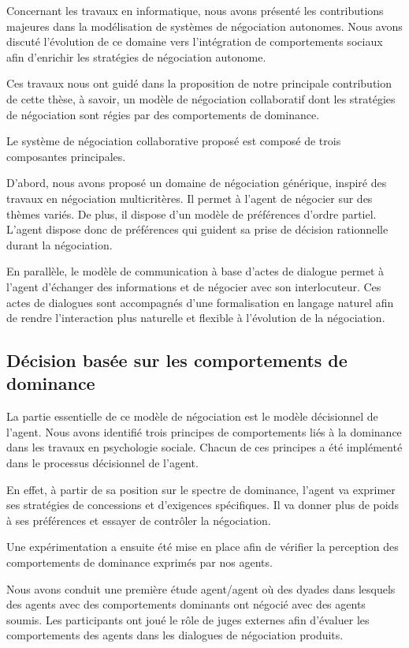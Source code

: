 Concernant les travaux en informatique, nous avons présenté les contributions majeures dans la modélisation de systèmes de négociation autonomes. Nous avons discuté l'évolution de ce domaine vers l'intégration de comportements sociaux afin d'enrichir les stratégies de négociation autonome. 

Ces travaux nous ont guidé dans la proposition de notre principale contribution de cette thèse, à savoir, un modèle de négociation collaboratif dont les stratégies de négociation sont régies par des comportements de dominance.

Le système de négociation collaborative proposé est composé de trois composantes principales.

D'abord, nous avons proposé un domaine de négociation générique, inspiré des travaux en négociation multicritères. Il permet à l'agent de négocier sur des thèmes variés. De plus, il dispose d'un modèle de préférences d'ordre partiel. L'agent dispose donc de préférences qui guident sa prise de décision rationnelle durant la négociation.

En parallèle, le modèle de communication à base d'actes de dialogue permet à l'agent d'échanger des informations et de négocier avec son interlocuteur. Ces actes de dialogues sont accompagnés d'une formalisation en langage naturel afin de rendre l'interaction plus naturelle et flexible à l'évolution de la négociation.

\subsection{Décision basée sur les comportements de dominance}

La partie essentielle de ce modèle de négociation est le modèle décisionnel de l'agent. Nous avons identifié trois principes de comportements liés à la dominance dans les travaux  en psychologie sociale. Chacun de ces principes a été implémenté dans le processus décisionnel de l'agent.

En effet, à partir de sa position sur le spectre de dominance, l'agent va exprimer ses stratégies de concessions et d'exigences spécifiques. Il va donner plus de poids à ses préférences et essayer de contrôler la négociation. 

Une expérimentation a ensuite été mise en place afin de vérifier la perception des comportements de dominance exprimés par nos agents.

Nous avons conduit une première étude agent/agent où des dyades dans lesquels des agents avec des comportements dominants ont négocié avec des agents soumis. Les participants ont joué le rôle de juges externes afin d'évaluer les comportements des agents dans les dialogues de négociation produits. 

